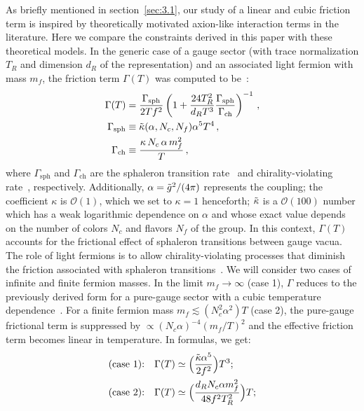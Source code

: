 \documentclass[a4paper,11pt]{article}
\begin{document}
As briefly mentioned in section~\ref{sec:3.1}, our study of a linear and cubic friction term is inspired by theoretically motivated axion-like interaction terms in the literature. Here we compare the constraints derived in this paper with these theoretical models.
In the generic case of a gauge sector (with trace normalization $T_R$ and dimension $d_R$ of the representation) and an associated light fermion with mass $m_f$, the friction term $\Gamma (T)$ was computed to be~\cite{Berghaus:2020ekh}:
\begin{align}
    \Gamma (T)&=\frac{\Gamma_{\mathrm{sph}}}{2 T f^{2}}\left(1 + \frac{24 T_{R}^{2}}{d_{R} T^3} \frac{\Gamma_{\mathrm{sph}}}{\Gamma_{\mathrm{ch}}}\right)^{-1}\,, \label{eq:gamma1} \\
    \Gamma_{\mathrm{sph}}&\equiv\Tilde{\kappa}(\alpha,N_c,N_f)\alpha^5 T^4\,, \\
    \Gamma_{\mathrm{ch}}&\equiv \frac{\kappa\, N_c\,\alpha\, m_f^2}{T}\,,
\end{align}
where $\Gamma_{\mathrm{sph}}$ and $\Gamma_{\mathrm{ch}}$ are the sphaleron transition rate~\cite{Arnold:1996dy} and chirality-violating rate~\cite{Boyarsky:2020cyk}, respectively. Additionally, $\alpha=\Tilde{g}^2/(4\pi)$ represents the coupling; the coefficient $\kappa$ is $\mathcal{O}(1)$, which we set to $\kappa = 1$ henceforth; $\Tilde{\kappa}$ is a $\mathcal{O}(100)$ number which has a weak logarithmic dependence on $\alpha$ and whose exact value depends on the number of colors $N_c$ and flavors $N_f$ of the group. In this context, $\Gamma(T)$ accounts for the frictional effect of sphaleron transitions between gauge vacua. The role of light fermions is to allow chirality-violating processes that diminish the friction associated with sphaleron transitions~\cite{Berghaus:2020ekh}. We will consider two cases of infinite and finite fermion masses. In the limit $m_f \rightarrow \infty$ (case 1), $\Gamma$ reduces to the previously derived form for a pure-gauge sector with a cubic temperature dependence~\cite{Berghaus:2019whh}. For a finite fermion mass $m_f\lesssim (N_c^2\alpha^2)T$ (case 2), the pure-gauge frictional term is suppressed by $\propto (N_c\alpha)^{-4}(m_f/T)^2$ and the effective friction term becomes linear in temperature. In formulas, we get:
\begin{align}
    \text{(case 1):} \quad \Gamma(T)&\simeq \Big(\frac{\Tilde{\kappa} \alpha^5}{2f^2}\Big)T^3; \label{eq:gamma2} \\
    \text{(case 2):} \quad \Gamma(T)&\simeq \Big(\frac{d_R N_c \alpha m_f^2}{48 f^2 T_R^2}\Big)T; \label{eq:gamma3}
\end{align}
\end{document}
